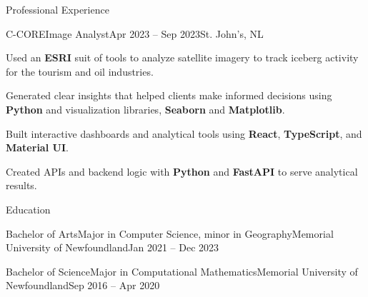 \documentclass[]{Keenan-Nicholson-Resume}
\begin{document}
\begin{section}{Professional Experience}
    \begin{subsection}{C-CORE}{Image Analyst}{Apr 2023 -- Sep 2023}{St. John's, NL}
        \item Used an \textbf{ESRI} suit of tools to analyze satellite imagery to track iceberg activity for the tourism and oil industries.
        \item Generated clear insights that helped clients make informed decisions using \textbf{Python} and visualization libraries, \textbf{Seaborn} and \textbf{Matplotlib}.
        \item Built interactive dashboards and analytical tools using \textbf{React}, \textbf{TypeScript}, and \textbf{Material UI}.
        \item Created APIs and backend logic with \textbf{Python} and \textbf{FastAPI} to serve analytical results.
    \end{subsection}
    
\end{section}

\begin{section}{Education}
    \begin{subsection}{Bachelor of Arts}{Major in Computer Science, minor in Geography}{Memorial University of Newfoundland}{Jan 2021 -- Dec 2023}
    \end{subsection}
    \begin{subsection}{Bachelor of Science}{Major in Computational Mathematics}{Memorial University of Newfoundland}{Sep 2016 -- Apr 2020}
    \end{subsection}
\end{section}

\end{document}
